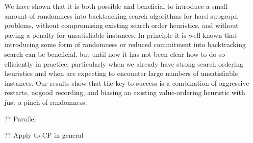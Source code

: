 \documentclass[runningheads]{llncs}
\begin{document}
We have shown that it is both possible and beneficial to introduce a small amount of randomness into
backtracking search algorithms for hard subgraph problems, without compromising existing search
order heuristics, and without paying a penalty for unsatisfiable instances. In principle it is
well-known that introducing some form of randomness \cite{DBLP:conf/aaai/GomesSK98} or reduced
commitment \cite{DBLP:conf/ijcai/HarveyG95} into backtracking search can be beneficial, but until
now it has not been clear how to do so efficiently in practice, particularly when we already have
strong search ordering heuristics and when are expecting to encounter large numbers of unsatisfiable
instances. Our results show that the key to success is a combination of aggressive restarts, nogood
recording, and biasing an existing value-ordering heuristic with just a pinch of randomness.

?? Parallel

?? Apply to CP in general

% 



\end{document}
